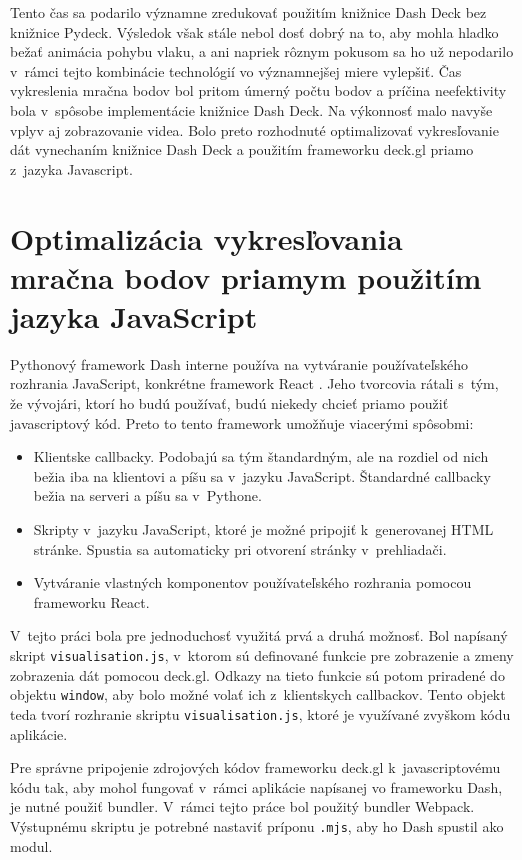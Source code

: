 Tento čas sa podarilo významne zredukovať použitím knižnice Dash Deck bez knižnice Pydeck. Výsledok však stále nebol dosť dobrý na to, aby mohla hladko bežať animácia pohybu vlaku, a ani napriek rôznym pokusom sa ho už nepodarilo v~rámci tejto kombinácie technológií vo významnejšej miere vylepšiť. Čas vykreslenia mračna bodov bol pritom úmerný počtu bodov a príčina neefektivity bola v~spôsobe implementácie knižnice Dash Deck. Na výkonnosť malo navyše vplyv aj zobrazovanie videa. Bolo preto rozhodnuté optimalizovať vykresľovanie dát vynechaním knižnice Dash Deck a použitím frameworku deck.gl priamo z~jazyka Javascript.

\section{Optimalizácia vykresľovania mračna bodov priamym použitím jazyka JavaScript}

Pythonový framework Dash interne používa na vytváranie používateľského rozhrania JavaScript, konkrétne framework React \cite{dash_documentation}. Jeho tvorcovia rátali s~tým, že vývojári, ktorí ho budú používať, budú niekedy chcieť priamo použiť javascriptový kód. Preto to tento framework umožňuje viacerými spôsobmi:

\begin{itemize}
    \item Klientske callbacky. Podobajú sa tým štandardným, ale na rozdiel od nich bežia iba na klientovi a píšu sa v~jazyku JavaScript. Štandardné callbacky bežia na serveri a píšu sa v~Pythone.
    \item Skripty v~jazyku JavaScript, ktoré je možné pripojiť k~generovanej HTML stránke. Spustia sa automaticky pri otvorení stránky v~prehliadači.
    \item Vytváranie vlastných komponentov používateľského rozhrania pomocou frameworku React.
\end{itemize}

V~tejto práci bola pre jednoduchosť využitá prvá a druhá možnosť. Bol napísaný skript \texttt{visualisation.js}, v~ktorom sú definované funkcie pre zobrazenie a zmeny zobrazenia dát pomocou deck.gl. Odkazy na tieto funkcie sú potom priradené do objektu \texttt{window}, aby bolo možné volať ich z~klientskych callbackov. Tento objekt teda tvorí rozhranie skriptu \texttt{visualisation.js}, ktoré je využívané zvyškom kódu aplikácie.

Pre správne pripojenie zdrojových kódov frameworku deck.gl k~javascriptovému kódu tak, aby mohol fungovať v~rámci aplikácie napísanej vo frameworku Dash, je nutné použiť bundler. V~rámci tejto práce bol použitý bundler Webpack. Výstupnému skriptu je potrebné nastaviť príponu \texttt{.mjs}, aby ho Dash spustil ako modul.

